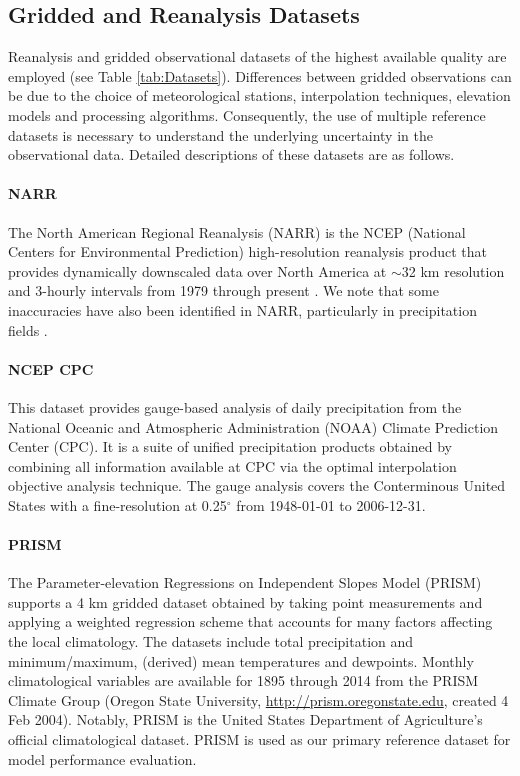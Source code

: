 \subsection{Gridded and Reanalysis Datasets}

Reanalysis and gridded observational datasets of the highest available quality are employed (see Table \ref{tab:Datasets}). Differences between gridded observations can be due to the choice of meteorological stations, interpolation techniques, elevation models and processing algorithms.  Consequently, the use of multiple reference datasets is necessary to understand the underlying uncertainty in the observational data.  Detailed descriptions of these datasets are as follows.

\paragraph{NARR}  The North American Regional Reanalysis (NARR) is the NCEP (National Centers for Environmental Prediction) high-resolution reanalysis product that provides dynamically downscaled data over North America at $\sim$32 km resolution and 3-hourly intervals from 1979 through present \cite{mesinger2006north}. We note that some inaccuracies have also been identified in NARR, particularly in precipitation fields \cite{bukovsky2007brief}.

\paragraph{NCEP CPC} This dataset provides gauge-based analysis of daily precipitation from the National Oceanic and Atmospheric Administration (NOAA) Climate Prediction Center (CPC). It is a suite of unified precipitation products obtained by combining all information available at CPC via the optimal interpolation objective analysis technique. The gauge analysis covers the Conterminous United States with a fine-resolution at 0.25$^\circ$ from 1948-01-01 to 2006-12-31.


\paragraph{PRISM} The Parameter-elevation Regressions on Independent Slopes Model (PRISM) \cite{daly2008physiographically} supports a 4 km gridded dataset obtained by taking point measurements and applying a weighted regression scheme that accounts for many factors affecting the local climatology. The datasets include total precipitation and minimum/maximum, (derived) mean temperatures and dewpoints. Monthly climatological variables are available for 1895 through 2014 from the PRISM Climate Group (Oregon State University, \url{http://prism.oregonstate.edu}, created 4 Feb 2004). Notably, PRISM is the United States Department of Agriculture's official climatological dataset.  PRISM is used as our primary reference dataset for model performance evaluation.

